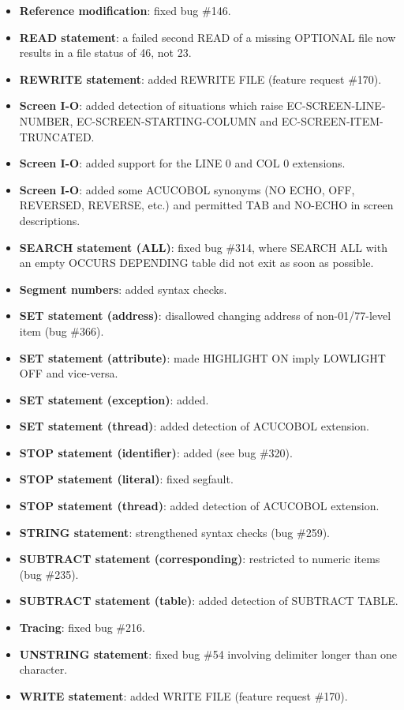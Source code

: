 \begin{itemize}
\item \textbf{Reference modification}: fixed bug \#146.
\item \textbf{READ statement}: a failed second READ of a missing OPTIONAL file now results in a file status of 46, not 23.
\item \textbf{REWRITE statement}: added REWRITE FILE (feature request \#170).
\item \textbf{Screen I-O}: added detection of situations which raise EC-SCREEN-LINE-NUMBER, EC-SCREEN-STARTING-COLUMN and EC-SCREEN-ITEM-TRUNCATED.
\item \textbf{Screen I-O}: added support for the LINE 0 and COL 0 extensions.
\item \textbf{Screen I-O}: added some ACUCOBOL synonyms (NO ECHO, OFF, REVERSED, REVERSE, etc.) and permitted TAB and NO-ECHO in screen descriptions.
\item \textbf{SEARCH statement (ALL)}: fixed bug \#314, where SEARCH ALL with an empty OCCURS DEPENDING table did not exit as soon as possible.
\item \textbf{Segment numbers}: added syntax checks.
\item \textbf{SET statement (address)}: disallowed changing address of non-01\slash{}77-level item (bug \#366).
\item \textbf{SET statement (attribute)}: made HIGHLIGHT ON imply LOWLIGHT OFF and vice-versa.
\item \textbf{SET statement (exception)}: added.
\item \textbf{SET statement (thread)}: added detection of ACUCOBOL extension.
\item \textbf{STOP statement (identifier)}: added (see bug \#320).
\item \textbf{STOP statement (literal)}: fixed segfault.
\item \textbf{STOP statement (thread)}: added detection of ACUCOBOL extension.
\item \textbf{STRING statement}: strengthened syntax checks (bug \#259).
\item \textbf{SUBTRACT statement (corresponding)}: restricted to numeric items (bug \#235).
\item \textbf{SUBTRACT statement (table)}: added detection of SUBTRACT TABLE.
\item \textbf{Tracing}: fixed bug \#216.
\item \textbf{UNSTRING statement}: fixed bug \#54 involving delimiter longer than one character.
\item \textbf{WRITE statement}: added WRITE FILE (feature request \#170).
\end{itemize}

